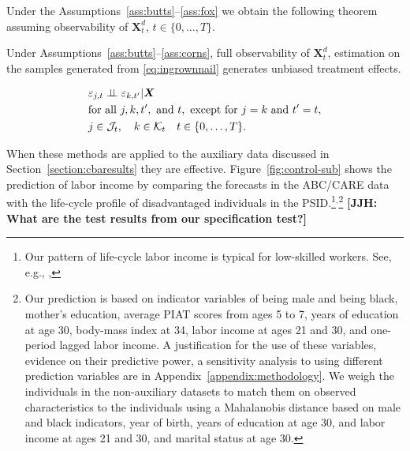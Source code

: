 Under the Assumptions~\ref{ass:butts}--\ref{ass:fox} we obtain the following theorem assuming observability of $\bm{X}^d_t$, $t \in \{0,\dots,T\}$.

\begin{theorem}
Under Assumptions~\ref{ass:butts}--\ref{ass:corns}, full observability of $\bm{X}^d_t$, estimation on the samples generated from \eqref{eq:ingrownnail} generates unbiased treatment effects.
\end{theorem}
\begin{assumption}\label{ass:corns}
\begin{align*}
&\varepsilon_{j,t} \perp\!\!\!\perp \varepsilon_{k,t^\prime} | \bm{X}\\
&\text{for all } j, k, t^\prime, \text{ and } t, \text{ except for } j=k \text{ and } t^\prime = t,\\
&j \in \mathcal{J}_t, \quad k \in \mathcal{K}_t \quad t \in \{0,\dots,T\}.
\end{align*}
\end{assumption}

When these methods are applied to the auxiliary data discussed in Section~\ref{section:cbaresults} they are effective. Figure~\ref{fig:control-sub} shows the prediction of labor income by comparing the forecasts in the ABC/CARE data with the life-cycle profile of disadvantaged individuals in the PSID.\footnote{Our pattern of life-cycle labor income is typical for low-skilled workers. See, e.g., \cite{Blundell-etal_2015_J-Pub-E},}$^{,}$\footnote{Our prediction is based on indicator variables of being male and being black, mother's education, average PIAT scores from ages 5 to 7, years of education at age 30, body-mass index at 34, labor income at ages 21 and 30, and one-period lagged labor income. A justification for the use of these variables, evidence on their predictive power, a sensitivity analysis to using different prediction variables are in Appendix~\ref{appendix:methodology}. We weigh the individuals in the non-auxiliary datasets to match them on observed characteristics to the individuals using a Mahalanobis distance based on male and black indicators, year of birth, years of education at age 30, and labor income at ages 21 and 30, and marital status at age 30.} \textbf{[JJH: What are the test results from our specification test?]}


